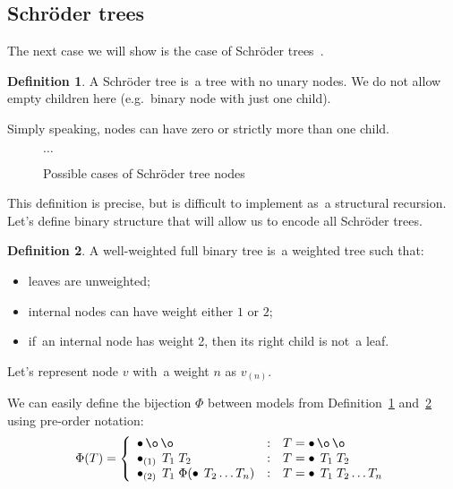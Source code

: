 \documentclass[final]{article}
\theoremstyle{definition}
\newtheorem{definition}{Definition}[subsection]
\theoremstyle{definition}
\theoremstyle{remark}
\newcommand{\weighted}[1]{\ensuremath{_{(#1)}}}
\DeclareMathOperator{\n}{\bullet}
\DeclareMathOperator{\no}{\o}
\begin{document}
\subsection{Schröder trees}%
\label{sub:schröder_trees}

The next case we will show is the case of Schröder trees~\cite{schroder}.

\begin{definition}
    \label{def:schroder_tree}
    A Schröder tree is~a tree with no unary nodes. We do not allow empty children here (e.g.~binary node with just one child).
\end{definition}

Simply speaking, nodes can have zero or strictly more than one child.

\begin{figure}[H]
    \centering
    
    
    
    
    \(\ldots\)
    \caption{Possible cases of Schröder tree nodes}
    \label{fig:schroder_trees}
\end{figure}

This definition is precise, but is difficult to implement as~a structural recursion. Let's define binary structure that will allow us to encode all Schröder trees.

\begin{definition}
    \label{def:well_weighted}
    A well-weighted full binary tree is~a weighted tree such that:
    \begin{itemize}
        \item leaves are unweighted;
        \item internal nodes can have weight either \(1\) or \(2\);
        \item if~an internal node has weight 2, then its right child is not~a leaf.
    \end{itemize}
\end{definition}

Let's represent node \(v\) with~a weight \(n\) as \(v\weighted{n}\).

We can easily define the bijection \(\Phi\) between models from Definition~\ref{def:schroder_tree} and~\ref{def:well_weighted} using pre-order notation:
\[\Phi(T) = \left\{\begin{array}{lcl}
            \n \no \no &:& T = \n \no \no \\
            \n\weighted{1}\; T_1\; T_2 &:& T = \n\; T_1\; T_2\\
            \n\weighted{2}\; T_1\; \Phi(\n\; T_2 \ldots T_n) &:& T = \n\; T_1\; T_2 \ldots T_n
\end{array}\right.\]
\end{document}
